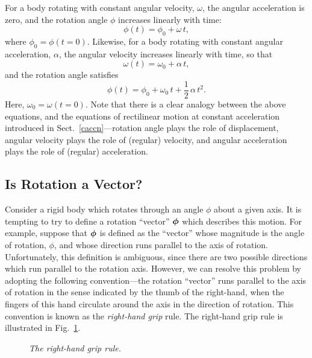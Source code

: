  For a body rotating with constant angular velocity, $\omega$,
the angular acceleration is zero, and the rotation angle $\phi$ increases linearly with time:
\begin{equation}
\phi(t) = \phi_0 + \omega\,t,
\end{equation}
where $\phi_0 = \phi(t=0)$. Likewise, for a body rotating with constant angular acceleration,
$\alpha$, the angular velocity increases linearly with time, so that
\begin{equation}
\omega(t) = \omega_0 + \alpha\,t,
\end{equation}
and the rotation angle satisfies
\begin{equation}
\phi(t) = \phi_0 + \omega_0\,t + \frac{1}{2}\,\alpha\,t^2.
\end{equation}
Here, $\omega_0=\omega(t=0)$. Note that there is a clear analogy between the above
equations, and the equations of rectilinear motion at constant acceleration introduced in 
Sect.~\ref{caccn}---rotation angle plays the role of displacement, angular velocity plays the role of (regular) velocity, and
angular acceleration plays the role of (regular) acceleration.

\subsection{Is Rotation a Vector?}\label{srotn}
Consider a rigid body which rotates through an angle $\phi$ about a given
axis.
It is tempting to try to define a rotation ``vector'' $\mbox{\boldmath$\phi$}$ which describes this
motion. For example, suppose that $\mbox{\boldmath$\phi$}$ is defined as the ``vector'' whose magnitude
is the angle of  rotation, $\phi$, and whose direction runs parallel to the axis of 
rotation. Unfortunately, this  definition is ambiguous, since there are
two possible directions which run parallel to the rotation axis. However, we can
resolve this problem by adopting the following convention---the
rotation ``vector'' runs parallel to the axis of rotation in the sense indicated by the
thumb of the right-hand, when the fingers of this hand circulate around the axis in the
direction of  rotation. This convention is known as the {\em right-hand grip} rule.
The right-hand grip rule is illustrated in Fig.~\ref{f69}.

\begin{figure}
\epsfysize=3in
\centerline{}
\caption{\em The right-hand grip rule.}\label{f69}  
\end{figure}


